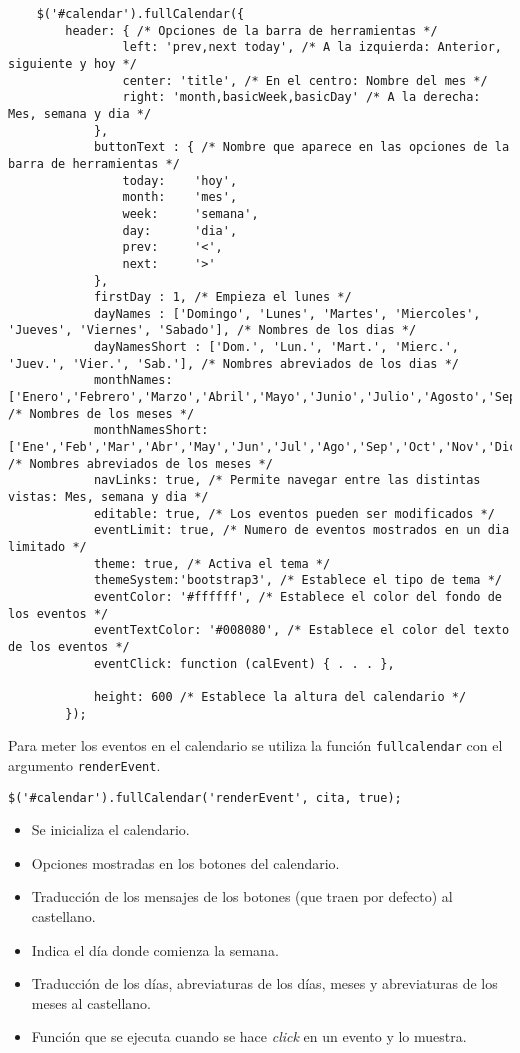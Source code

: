 \medskip
\begin{lstlisting}
	$('#calendar').fullCalendar({
		header: { /* Opciones de la barra de herramientas */
				left: 'prev,next today', /* A la izquierda: Anterior, siguiente y hoy */
				center: 'title', /* En el centro: Nombre del mes */
				right: 'month,basicWeek,basicDay' /* A la derecha: Mes, semana y dia */
			},
			buttonText : { /* Nombre que aparece en las opciones de la barra de herramientas */
				today:    'hoy',
				month:    'mes',
				week:     'semana',
				day:      'dia',
				prev:	  '<',
				next:	  '>'
			},
			firstDay : 1, /* Empieza el lunes */
			dayNames : ['Domingo', 'Lunes', 'Martes', 'Miercoles', 'Jueves', 'Viernes', 'Sabado'], /* Nombres de los dias */
			dayNamesShort : ['Dom.', 'Lun.', 'Mart.', 'Mierc.', 'Juev.', 'Vier.', 'Sab.'], /* Nombres abreviados de los dias */
			monthNames: ['Enero','Febrero','Marzo','Abril','Mayo','Junio','Julio','Agosto','Septiembre','Octubre','Noviembre','Diciembre'], /* Nombres de los meses */
			monthNamesShort: ['Ene','Feb','Mar','Abr','May','Jun','Jul','Ago','Sep','Oct','Nov','Dic'], /* Nombres abreviados de los meses */
			navLinks: true, /* Permite navegar entre las distintas vistas: Mes, semana y dia */
			editable: true, /* Los eventos pueden ser modificados */
			eventLimit: true, /* Numero de eventos mostrados en un dia limitado */
			theme: true, /* Activa el tema */
			themeSystem:'bootstrap3', /* Establece el tipo de tema */
			eventColor: '#ffffff', /* Establece el color del fondo de los eventos */
			eventTextColor: '#008080', /* Establece el color del texto de los eventos */
			eventClick: function (calEvent) { . . . },

			height: 600 /* Establece la altura del calendario */
		});
\end{lstlisting}


Para meter los eventos en el calendario se utiliza la función \texttt{fullcalendar} con el argumento \texttt{renderEvent}.


\medskip
\begin{lstlisting}
$('#calendar').fullCalendar('renderEvent', cita, true);
\end{lstlisting}


\begin{itemize}
\item Se inicializa el calendario.
\item Opciones mostradas en los botones del calendario.
\item Traducción de los mensajes de los botones (que traen por defecto) al castellano.
\item Indica el día donde comienza la semana.
\item Traducción de los días, abreviaturas de los días, meses y abreviaturas de los meses al castellano.
\item Función que se ejecuta cuando se hace \textit{click} en un evento y lo muestra.
\end{itemize}